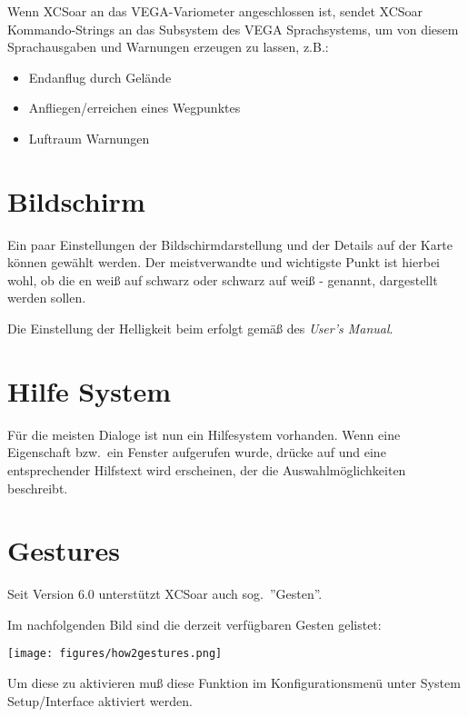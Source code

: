 Wenn \textsf{XCSoar} an das VEGA-Variometer angeschlossen ist,  sendet \textsf{XCSoar} Kommando-Strings an das Subsystem des VEGA Sprachsystems, um von diesem Sprachausgaben und Warnungen erzeugen zu lassen, z.B.:

\begin{itemize}
\item Endanflug durch Gelände
\item Anfliegen/erreichen eines Wegpunktes
\item Luftraum Warnungen
\end{itemize}

\section{Bildschirm}

Ein paar Einstellungen der Bildschirmdarstellung und der Details auf der Karte können gewählt werden. Der meistverwandte und wichtigste Punkt ist hierbei wohl, ob die {\InfoBox}en weiß auf schwarz oder schwarz auf  weiß -  genannt, dargestellt werden sollen. 

Die Einstellung der Helligkeit beim \al erfolgt gemäß des {\em \al User's Manual}.


\section{Hilfe System}
  Für die meisten Dialoge ist nun ein Hilfesystem vorhanden.
  Wenn eine Eigenschaft bzw.\ ein Fenster aufgerufen wurde, drücke auf  und eine entsprechender Hilfstext wird erscheinen, der die Auswahlmöglichkeiten  beschreibt.

\section{Gestures}\label{sec:gestures}
Seit Version 6.0 unterstützt \textsf{XCSoar} auch sog.\  ''Gesten''.

Im nachfolgenden Bild sind die derzeit verfügbaren Gesten gelistet: 
\begin{center}
 \texttt{[image: figures/how2gestures.png]}
\end{center}

Um diese zu aktivieren muß diese Funktion im Konfigurationsmenü unter System Setup/Interface aktiviert werden. 

